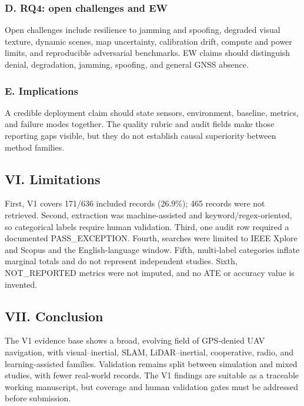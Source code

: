 \documentclass[
  journal,
  10pt]{IEEEtran}
\begin{document}
\subsubsection{D. RQ4: open challenges and
EW}\label{d-rq4-open-challenges-and-ew}

Open challenges include resilience to jamming and spoofing, degraded
visual texture, dynamic scenes, map uncertainty, calibration drift,
compute and power limits, and reproducible adversarial benchmarks. EW
claims should distinguish denial, degradation, jamming, spoofing, and
general GNSS absence.

\subsubsection{E. Implications}\label{e-implications}

A credible deployment claim should state sensors, environment, baseline,
metrics, and failure modes together. The quality rubric and audit fields
make those reporting gaps visible, but they do not establish causal
superiority between method families.

\subsection{VI. Limitations}\label{vi-limitations}

First, V1 covers 171/636 included records (26.9\%); 465 records were not
retrieved. Second, extraction was machine-assisted and
keyword/regex-oriented, so categorical labels require human validation.
Third, one audit row required a documented PASS\_EXCEPTION. Fourth,
searches were limited to IEEE Xplore and Scopus and the English-language
window. Fifth, multi-label categories inflate marginal totals and do not
represent independent studies. Sixth, NOT\_REPORTED metrics were not
imputed, and no ATE or accuracy value is invented.

\subsection{VII. Conclusion}\label{vii-conclusion}

The V1 evidence base shows a broad, evolving field of GPS-denied UAV
navigation, with visual--inertial, SLAM, LiDAR--inertial, cooperative,
radio, and learning-assisted families. Validation remains split between
simulation and mixed studies, with fewer real-world records. The V1
findings are suitable as a traceable working manuscript, but coverage
and human validation gates must be addressed before submission.
\end{document}
